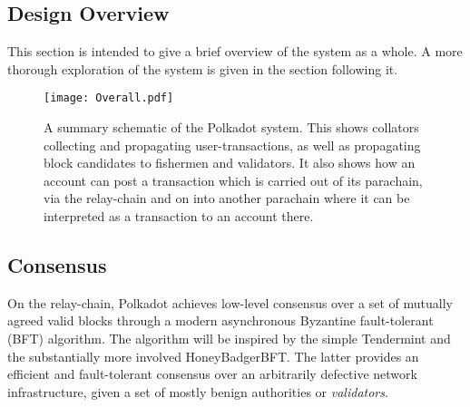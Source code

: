 \documentclass[9pt,oneside]{amsart}
\begin{document}
\begin{multicols}{2}

\section{Design Overview}\label{design-overview}

 This section is intended to give a brief overview of the system as a whole. A more thorough exploration of the system is given in the section following it.

\begin{figure*}
\texttt{[image: Overall.pdf]}
\caption{A summary schematic of the Polkadot system. This shows collators collecting and propagating user-transactions, as well as propagating block candidates to fishermen and validators. It also shows how an account can post a transaction which is carried out of its parachain, via the relay-chain and on into another parachain where it can be interpreted as a transaction to an account there.}
\end{figure*}

\subsection{Consensus}\label{consensus}

 On the relay-chain, Polkadot achieves low-level consensus over a set of mutually agreed valid blocks through a modern asynchronous Byzantine fault-tolerant (BFT) algorithm. The algorithm will be inspired by the simple Tendermint\cite{kwon2014tendermint} and the substantially more involved HoneyBadgerBFT\cite{miller2016honey}. The latter provides an efficient and fault-tolerant consensus over an arbitrarily defective network infrastructure, given a set of mostly benign authorities or \emph{validators}.


\end{multicols}
\end{document}
